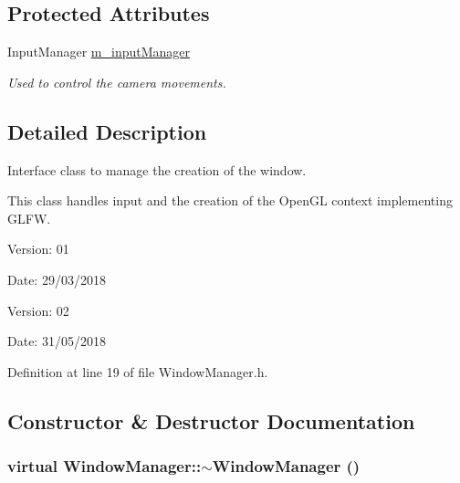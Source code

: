 \subsection*{Protected Attributes}
\begin{CompactItemize}
\item 
\hypertarget{class_window_manager_df17f87e4722c2a30b80a25081901dbd}{
InputManager \hyperlink{class_window_manager_df17f87e4722c2a30b80a25081901dbd}{m\_\-inputManager}}
\label{class_window_manager_df17f87e4722c2a30b80a25081901dbd}

\begin{CompactList}\small\item\em Used to control the camera movements. \item\end{CompactList}\end{CompactItemize}


\subsection{Detailed Description}
Interface class to manage the creation of the window. 

This class handles input and the creation of the OpenGL context implementing GLFW.

\begin{Desc}
\item[Version:]01 \end{Desc}
\begin{Desc}
\item[Date:]29/03/2018\end{Desc}
\begin{Desc}
\item[Version:]02 \end{Desc}
\begin{Desc}
\item[Date:]31/05/2018 \end{Desc}


Definition at line 19 of file WindowManager.h.

\subsection{Constructor \& Destructor Documentation}
\hypertarget{class_window_manager_d2c42494d2d9045b18a3a09e5920290f}{
\subsubsection[$\sim$WindowManager]{\setlength{\rightskip}{0pt plus 5cm}virtual WindowManager::$\sim$WindowManager ()}}
\label{class_window_manager_d2c42494d2d9045b18a3a09e5920290f}


